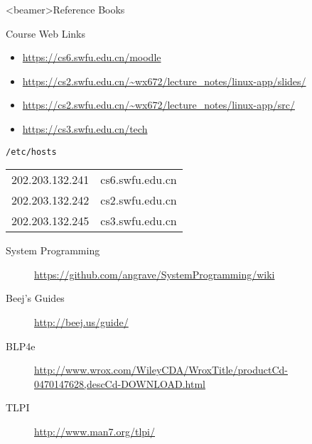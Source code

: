 \begin{frame}<beamer>{Reference Books}
  \begin{refsection}
    \textbooks \printbibliography[heading=none]
  \end{refsection}
\end{frame}

\begin{frame}{Course Web Links}
  \begin{itemize}
  \item[\moodle] \url{https://cs6.swfu.edu.cn/moodle}
  \item[\pdf] \url{https://cs2.swfu.edu.cn/~wx672/lecture_notes/linux-app/slides/}
  \item[\folder] \url{https://cs2.swfu.edu.cn/~wx672/lecture_notes/linux-app/src/}
  \item[\obook] \url{https://cs3.swfu.edu.cn/tech}
  \end{itemize}
  \begin{block}{\texttt{/etc/hosts}}
    \ttfamily
    \begin{tabular}{ll}
      202.203.132.241&cs6.swfu.edu.cn\\      
      202.203.132.242&cs2.swfu.edu.cn\\
      202.203.132.245&cs3.swfu.edu.cn\\      
    \end{tabular}
  \end{block}\footnotesize
  \begin{description}
  \item[System Programming] \url{https://github.com/angrave/SystemProgramming/wiki}
  \item[Beej's Guides] \url{http://beej.us/guide/}
  \item[BLP4e] \url{http://www.wrox.com/WileyCDA/WroxTitle/productCd-0470147628,descCd-DOWNLOAD.html}
  \item[TLPI] \url{http://www.man7.org/tlpi/}
  \end{description}
\end{frame}

